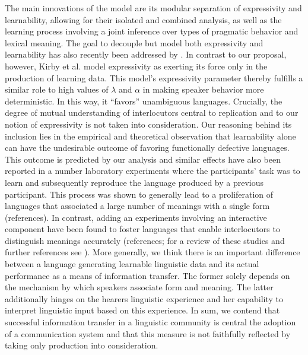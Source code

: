 \documentclass[a4paper]{article}
\newcommand{\hl}[1]{\textcolor[rgb]{.8,.33,.0}{#1}}%
\begin{document}
The main innovations of the model are its modular separation of expressivity and learnability, allowing for their isolated and combined analysis, as well as the learning process involving a joint inference over types of pragmatic behavior and lexical meaning. The goal to decouple but model both expressivity and learnability has also recently been addressed by \citet{kirby+etal:2015}. In contrast to our proposal, however, Kirby et al. model expressivity as exerting its force only in the production of learning data. This model's expressivity parameter thereby fulfills a similar role  to high values of $\lambda$ and $\alpha$ in making speaker behavior more deterministic. In this way, it ``favors'' unambiguous languages. Crucially, the degree of mutual understanding of interlocutors central to replication and to our notion of expressivity is not taken into consideration. Our reasoning behind its inclusion lies in the empirical and theoretical observation that learnability alone can have the undesirable outcome of favoring functionally defective languages. This outcome is predicted by our analysis and similar effects have also been reported in a number laboratory experiments where the participants' task was to learn and subsequently reproduce the language produced by a previous participant. This process was shown to generally lead to a proliferation of languages that associated a large number of meanings with a single form (\hl{references}). In contrast, adding an experiments involving an interactive component have been found to foster languages that enable interlocutors to distinguish meanings accurately  (\hl{references}; for a review of these studies and further references see \citealt{kirby+etal:2015, tamariz+kirby:2016}). More generally, we think there is an important difference between a language generating learnable linguistic data and its actual performance as a means of information transfer. The former solely depends on the mechanism by which speakers associate form and meaning. The latter additionally hinges on the hearers linguistic experience and her capability to interpret linguistic input based on this experience. In sum, we contend that successful information transfer in a linguistic community is central the adoption of a communication system and that this measure is not faithfully reflected by taking only production into consideration.
\end{document}
